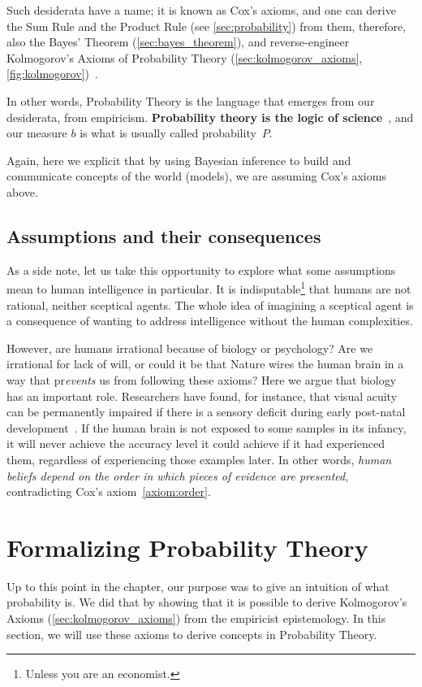 Such desiderata have a name; it is known as Cox's axioms, and one can derive the Sum Rule and the Product Rule (see \cref{sec:probability}) from them, therefore, also the Bayes' Theorem (\cref{sec:bayes_theorem}), and reverse-engineer Kolmogorov's Axioms of Probability Theory (\cref{sec:kolmogorov_axioms}, \cref{fig:kolmogorov})\label{future:cox_to_kolmogorov}~\cite{sowinski:2016, jaynes:2003, caticha:2008, terenin:2015}.

In other words, Probability Theory is the language that emerges from our desiderata, from empiricism. \textbf{Probability theory is the logic of science}~\cite{jaynes:2003}, and our measure \(b\) is what is usually called probability~\(P\).

Again, here we explicit that by using Bayesian inference to build and communicate concepts of the world (models), we are assuming Cox's axioms above.

\subsection{Assumptions and their consequences} As a side note, let us take this opportunity to explore what some assumptions mean to human intelligence in particular. It is indisputable\footnote{Unless you are an economist.} that humans are not rational, neither sceptical agents. The whole idea of imagining a sceptical agent is a consequence of wanting to address intelligence without the human complexities.

However, are humans irrational because of biology or psychology? Are we irrational for lack of will, or could it be that Nature wires the human brain in a way that pr\emph{events} us from following these axioms? Here we argue that biology has an important role. Researchers have found, for instance, that visual acuity can be permanently impaired if there is a sensory deficit during early post-natal development~\cite{wiesel:1982}. If the human brain is not exposed to some samples in its infancy, it will never achieve the accuracy level it could achieve if it had experienced them, regardless of experiencing those examples later. In other words, \emph{human beliefs depend on the order in which pieces of evidence are presented}, contradicting Cox's axiom~\ref{axiom:order}.


\section{Formalizing Probability Theory} Up to this point in the chapter, our purpose was to give an intuition of what probability is. We did that by showing that it is possible to derive Kolmogorov's Axioms (\cref{sec:kolmogorov_axioms}) from the empiricist epistemology. In this section, we will use these axioms to derive concepts in Probability Theory.

